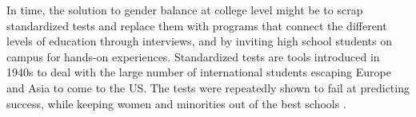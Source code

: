 \documentclass[utf8]{frontiersSCNS} %
\begin{document}




In time, the solution to gender balance at college level might be to scrap standardized tests and replace them with programs that connect the different levels of education through interviews, and by inviting high school students on campus for hands-on experiences. Standardized tests are tools introduced in 1940s to deal with the large number of international students escaping Europe and Asia to come to the US. The tests were repeatedly shown to fail at predicting success, while keeping women and minorities out of the best schools \citep{ripin1996fighting,miller2014test}.
\end{document}
